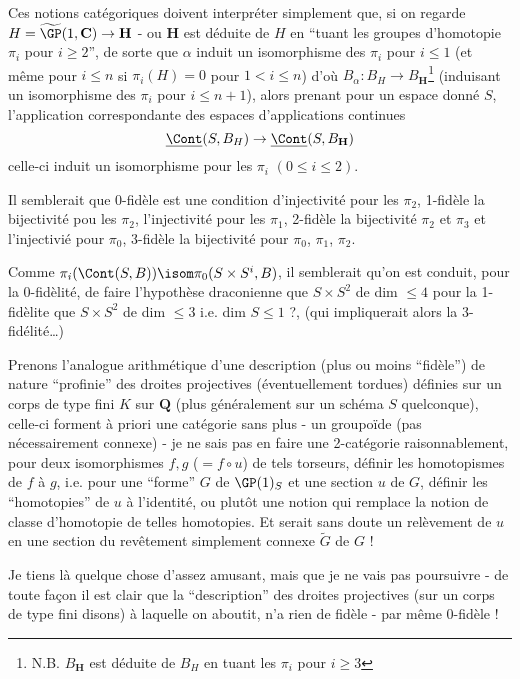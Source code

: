 Ces notions catégoriques doivent interpréter simplement que, si on regarde $H = \widetilde{\GP}(1, \mathbf{C}) \to \mathbf{H}$ - ou $\mathbf{H}$ est déduite de $H$ en ``tuant les groupes d'homotopie $\pi_i$ pour $i \geq 2$'', de sorte que $\alpha$ induit un isomorphisme des $\pi_i$ pour $i \leq 1$ (et même pour $i \leq n$ si $\pi_i (H) = 0$ pour $1 < i \leq n$) d'où $B_\alpha: B_H \to B_{\mathbf{H}}$\footnote{N.B. $B_{\mathbf{H}}$ est déduite de $B_H$ en tuant les $\pi_i$ pour $i \geq 3$} (induisant un isomorphisme des $\pi_i$ pour $i \leq n + 1$), alors prenant pour un espace donné $S$, l'application correspondante des espaces d'applications continues
$$
\underline{\Cont} (S, B_H) \to \underline{\Cont}(S, B_{\mathbf{H}})
$$
celle-ci induit un isomorphisme pour les $\pi_i$ $(0 \leq i \leq 2)$.

Il semblerait que 0-fidèle est une condition d'injectivité pour les $\pi_2$, 1-fidèle la bijectivité pou les $\pi_2$, l'injectivité pour les $\pi_1$, 2-fidèle la bijectivité $\pi_2$ et $\pi_3$ et l'injectivié pour $\pi_0$, 3-fidèle la bijectivité pour $\pi_0$, $\pi_1$, $\pi_2$.

Comme $\pi_i (\Cont (S, B)) \isom \pi_0 (S \times S^i, B)$, il semblerait qu'on est conduit, pour la 0-fidèlité, de faire l'hypothèse draconienne que $S \times S^2$ de dim $\leq 4$ pour la 1-fidèlite que $S \times S^2$ de dim $\leq 3$ i.e. dim $S \leq 1$ ?, (qui impliquerait alors la 3-fidélité\dots)

Prenons l'analogue arithmétique d'une description (plus ou moins ``fidèle'') de nature ``profinie'' des droites projectives (éventuellement tordues) définies sur un corps de type fini $K$ sur $\mathbf{Q}$ (plus généralement sur un schéma $S$ quelconque), celle-ci forment à priori une catégorie sans plus - un groupoïde (pas nécessairement connexe) - je ne sais pas en faire une 2-catégorie raisonnablement, pour deux isomorphismes $f, g$ ($= f \circ u$) de tels torseurs, définir les homotopismes de $f$ à $g$, i.e. pour une ``forme'' $G$ de $\GP (1)_S$ et une section $u$ de $G$, définir les ``homotopies'' de $u$ à l'identité, ou plutôt une notion qui remplace la notion de classe d'homotopie de telles homotopies. Et serait sans doute un relèvement de $u$ en une section du revêtement simplement connexe $\widetilde{G}$ de $G$ !

Je tiens là quelque chose d'assez amusant, mais que je ne vais pas poursuivre - de toute fa\c{c}on il est clair que la ``description'' des droites projectives (sur un corps de type fini disons) à laquelle on aboutit, n'a rien de fidèle - par même 0-fidèle !

